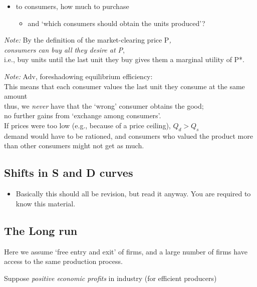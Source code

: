 \documentclass[]{article}
\providecommand{\tightlist}{%
  \setlength{\itemsep}{0pt}\setlength{\parskip}{0pt}}
\begin{document}
\begin{itemize}
\tightlist
\item
  to consumers, how much to purchase

  \begin{itemize}
  \tightlist
  \item
    and `which consumers should obtain the units produced'?
  \end{itemize}
\end{itemize}

\emph{Note:}
By the definition of the market-clearing price P\emph{,\\
consumers can buy all they desire at P},\\
i.e., buy units until the last unit they buy gives them a marginal utility of P*.

\emph{Note:}
Adv, foreshadowing equilibrium efficiency:\\
This means that each consumer values the last unit they consume at the same amount\\
thus, we \emph{never} have that the `wrong' consumer obtains the good;\\
no further gains from `exchange among consumers'.\\
If prices were too low (e.g., because of a price ceiling), \(Q_d>Q_s\)\\
demand would have to be rationed, and consumers who valued the product more than other consumers might not get as much.

\hypertarget{shifts-in-s-and-d-curves}{%
\subsection{Shifts in S and D curves}\label{shifts-in-s-and-d-curves}}

\begin{itemize}
\tightlist
\item
  Basically this should all be revision, but read it anyway. You are required to know this material.
\end{itemize}

\hypertarget{the-long-run}{%
\subsection{The Long run}\label{the-long-run}}

Here we assume `free entry and exit' of firms, and a large number of firms have access to the same production process.

Suppose \emph{positive economic profits} in industry (for efficient producers)
\end{document}
